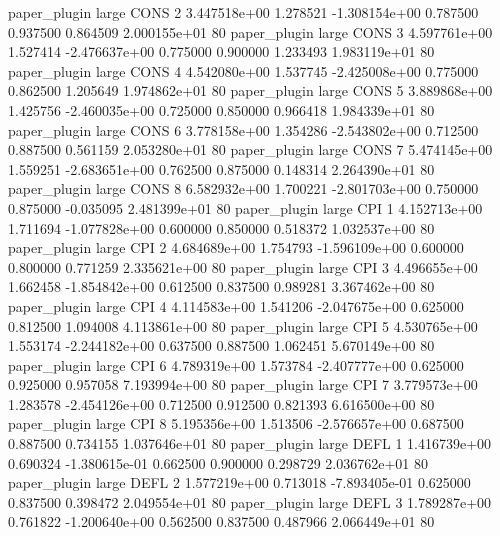        paper_plugin      large     CONS                 2 3.447518e+00      1.278521 -1.308154e+00 0.787500 0.937500       0.864509 2.000155e+01 80
       paper_plugin      large     CONS                 3 4.597761e+00      1.527414 -2.476637e+00 0.775000 0.900000       1.233493 1.983119e+01 80
       paper_plugin      large     CONS                 4 4.542080e+00      1.537745 -2.425008e+00 0.775000 0.862500       1.205649 1.974862e+01 80
       paper_plugin      large     CONS                 5 3.889868e+00      1.425756 -2.460035e+00 0.725000 0.850000       0.966418 1.984339e+01 80
       paper_plugin      large     CONS                 6 3.778158e+00      1.354286 -2.543802e+00 0.712500 0.887500       0.561159 2.053280e+01 80
       paper_plugin      large     CONS                 7 5.474145e+00      1.559251 -2.683651e+00 0.762500 0.875000       0.148314 2.264390e+01 80
       paper_plugin      large     CONS                 8 6.582932e+00      1.700221 -2.801703e+00 0.750000 0.875000      -0.035095 2.481399e+01 80
       paper_plugin      large      CPI                 1 4.152713e+00      1.711694 -1.077828e+00 0.600000 0.850000       0.518372 1.032537e+00 80
       paper_plugin      large      CPI                 2 4.684689e+00      1.754793 -1.596109e+00 0.600000 0.800000       0.771259 2.335621e+00 80
       paper_plugin      large      CPI                 3 4.496655e+00      1.662458 -1.854842e+00 0.612500 0.837500       0.989281 3.367462e+00 80
       paper_plugin      large      CPI                 4 4.114583e+00      1.541206 -2.047675e+00 0.625000 0.812500       1.094008 4.113861e+00 80
       paper_plugin      large      CPI                 5 4.530765e+00      1.553174 -2.244182e+00 0.637500 0.887500       1.062451 5.670149e+00 80
       paper_plugin      large      CPI                 6 4.789319e+00      1.573784 -2.407777e+00 0.625000 0.925000       0.957058 7.193994e+00 80
       paper_plugin      large      CPI                 7 3.779573e+00      1.283578 -2.454126e+00 0.712500 0.912500       0.821393 6.616500e+00 80
       paper_plugin      large      CPI                 8 5.195356e+00      1.513506 -2.576657e+00 0.687500 0.887500       0.734155 1.037646e+01 80
       paper_plugin      large     DEFL                 1 1.416739e+00      0.690324 -1.380615e-01 0.662500 0.900000       0.298729 2.036762e+01 80
       paper_plugin      large     DEFL                 2 1.577219e+00      0.713018 -7.893405e-01 0.625000 0.837500       0.398472 2.049554e+01 80
       paper_plugin      large     DEFL                 3 1.789287e+00      0.761822 -1.200640e+00 0.562500 0.837500       0.487966 2.066449e+01 80
